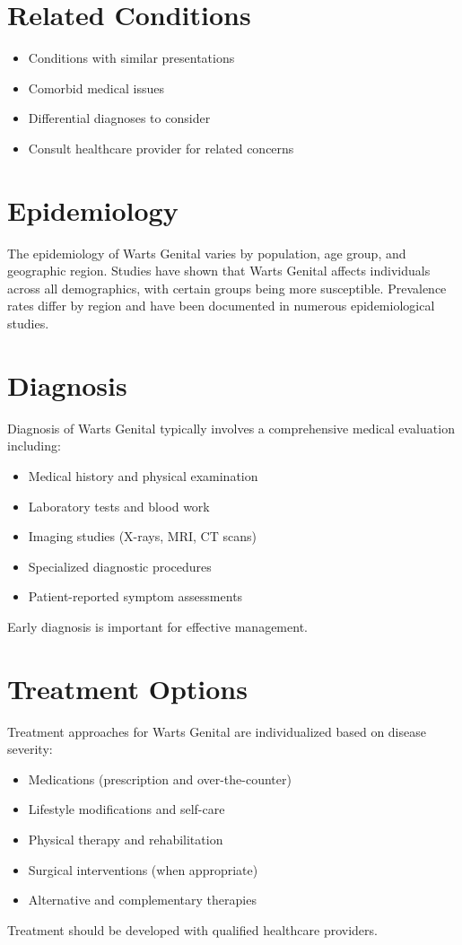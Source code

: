 \section*{Related Conditions}
\begin{itemize}
  \item Conditions with similar presentations
  \item Comorbid medical issues
  \item Differential diagnoses to consider
  \item Consult healthcare provider for related concerns
\end{itemize}

\section*{Epidemiology}
The epidemiology of Warts Genital varies by population, age group, and geographic region. Studies have shown that Warts Genital affects individuals across all demographics, with certain groups being more susceptible. Prevalence rates differ by region and have been documented in numerous epidemiological studies.

\section*{Diagnosis}
Diagnosis of Warts Genital typically involves a comprehensive medical evaluation including:
\begin{itemize}
  \item Medical history and physical examination
  \item Laboratory tests and blood work
  \item Imaging studies (X-rays, MRI, CT scans)
  \item Specialized diagnostic procedures
  \item Patient-reported symptom assessments
\end{itemize}
Early diagnosis is important for effective management.

\section*{Treatment Options}
Treatment approaches for Warts Genital are individualized based on disease severity:
\begin{itemize}
  \item Medications (prescription and over-the-counter)
  \item Lifestyle modifications and self-care
  \item Physical therapy and rehabilitation
  \item Surgical interventions (when appropriate)
  \item Alternative and complementary therapies
\end{itemize}
Treatment should be developed with qualified healthcare providers.

